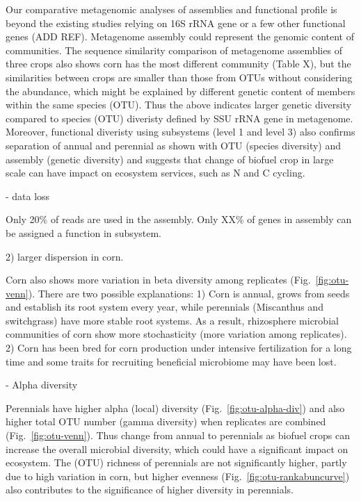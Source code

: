\documentclass[12pt]{article}
\begin{document}
Our comparative metagenomic analyses of assemblies and functional profile is beyond the existing studies relying on 16S rRNA gene or a few other functional genes (ADD REF). Metagenome assembly could represent the genomic content of communities. The sequence similarity comparison of metagenome assemblies of three crops also shows corn has the most different community (Table X), but the similarities between crops are smaller than those from OTUs without considering the abundance, which might be explained by different genetic content of members within the same species (OTU). Thus the above indicates larger genetic diversity compared to species (OTU) diveristy defined by SSU rRNA gene in metagenome. Moreover, functional diveristy using subsystems (level 1 and level 3) also confirms separation of annual and perennial as shown with OTU (species diversity) and assembly (genetic diversity) and suggests that change of biofuel crop in large scale can have impact on ecosystem services, such as N and C cycling.

- data loss

Only 20\% of reads are used in the assembly. Only XX\% of genes in assembly can be assigned a function in subsystem.

2) larger dispersion in corn.

Corn also shows more variation in beta diversity among replicates (Fig.~\ref{fig:otu-venn}). There are two possible explanations: 1) Corn is annual, grows from seeds and establish its root system every year, while perennials (Miscanthus and switchgrass) have more stable root systems. As a result, rhizosphere microbial communities of corn show more stochasticity (more variation among replicates). 2) Corn has been bred for corn production under intensive fertilization for a long time and some traits for recruiting beneficial microbiome may have been lost.

- Alpha diversity

Perennials have higher alpha (local) diversity (Fig.~\ref{fig:otu-alpha-div}) and also higher total OTU number (gamma diversity) when replicates are combined (Fig.~\ref{fig:otu-venn}). Thus change from annual to perennials as biofuel crops can increase the overall microbial diversity, which could have a significant impact on ecosystem. The (OTU) richness of perennials are not significantly higher, partly due to high variation in corn, but higher evenness (Fig.~\ref{fig:otu-rankabuncurve}) also contributes to the significance of higher diversity in perennials. 
\end{document}
